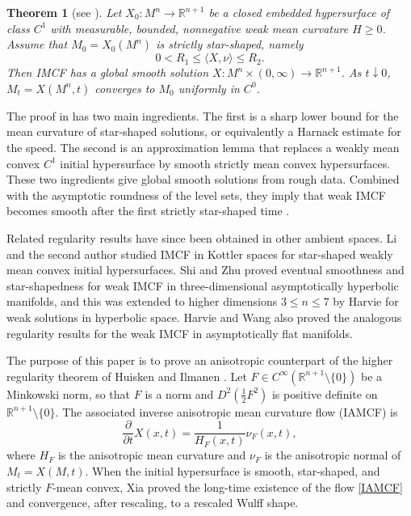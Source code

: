 \documentclass[10pt,a4paper]{amsart}
\newtheorem{theorem}[proposition]{Theorem}
\numberwithin{equation}{section}
\begin{document}
	\begin{theorem}[see {\cite[Theorem 2.5]{HI08}}]
		\label{higher-HI}
		Let $X_0:M^n\to\mathbb{R}^{n+1}$ be a closed embedded hypersurface of class $C^1$ with measurable, bounded, nonnegative weak mean curvature $H\geq 0$. Assume that $M_0=X_0(M^n)$ is strictly star-shaped, namely
		\begin{equation*}
			0<R_1\leq \langle X,\nu\rangle\leq R_2.
		\end{equation*}
		Then IMCF has a global smooth solution $X:M^n\times(0,\infty)\to\mathbb{R}^{n+1}$. As $t\downarrow 0$, $M_t=X(M^n,t)$ converges to $M_0$ uniformly in $C^0$. 
	\end{theorem}
	
	The proof in \cite{HI08} has two main ingredients. The first is a sharp lower bound for the mean curvature of star-shaped solutions, or equivalently a Harnack estimate for the speed. The second is an approximation lemma that replaces a weakly mean convex $C^1$ initial hypersurface by smooth strictly mean convex hypersurfaces. These two ingredients give global smooth solutions from rough data. Combined with the asymptotic roundness of the level sets, they imply that weak IMCF becomes smooth after the first strictly star-shaped time \cite[Theorem 2.7]{HI08}.
	
	Related regularity results have since been obtained in other ambient spaces. Li and the second author \cite{LW17} studied IMCF in Kottler spaces for star-shaped weakly mean convex initial hypersurfaces. Shi and Zhu \cite{SZ21} proved eventual smoothness and star-shapedness for weak IMCF in three-dimensional asymptotically hyperbolic manifolds, and this was extended to higher dimensions $3\leq n\leq 7$ by Harvie \cite{Har24} for weak solutions in hyperbolic space. Harvie and Wang \cite{HarW25} also proved the analogous regularity results for the weak IMCF in asymptotically flat manifolds.
	
	The purpose of this paper is to prove an anisotropic counterpart of the higher regularity theorem of Huisken and Ilmanen \cite{HI08}. Let $F\in C^{\infty}(\mathbb{R}^{n+1}\setminus\{0\})$ be a Minkowski norm, so that $F$ is a norm and $D^2(\frac{1}{2}F^2)$ is positive definite on $\mathbb{R}^{n+1}\setminus\{0\}$. The associated inverse anisotropic mean curvature flow (IAMCF) is
	\begin{equation}
		\label{IAMCF}
		\frac{\partial }{\partial t} X(x,t)=\frac{1}{H_F(x,t)}\nu_F(x,t),
	\end{equation}
	where $H_F$ is the anisotropic mean curvature and $\nu_F$ is the anisotropic normal of $M_t=X(M,t)$. When the initial hypersurface is smooth, star-shaped, and strictly $F$-mean convex, Xia \cite{Xia17} proved the long-time existence of the flow \eqref{IAMCF} and convergence, after rescaling, to a rescaled Wulff shape.
	
\end{document}
